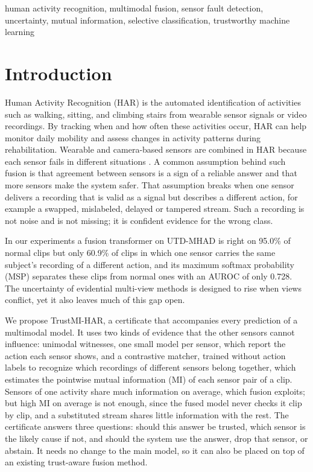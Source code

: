 \documentclass[conference]{IEEEtran}
\begin{document}
\begin{IEEEkeywords}
human activity recognition, multimodal fusion, sensor fault detection, uncertainty, mutual information, selective classification, trustworthy machine learning
\end{IEEEkeywords}

\section{Introduction}
Human Activity Recognition (HAR) is the automated identification of activities such as walking, sitting, and climbing stairs from wearable sensor signals or video recordings\cite{T1,T2}. By tracking when and how often these activities occur, HAR can help monitor daily mobility and assess changes in activity patterns during rehabilitation\cite{T3,T4,T5}.
Wearable and camera-based sensors are combined in HAR because each sensor fails in different situations \cite{Ref1,Ref2,Ref3}. A common assumption behind such fusion is that agreement between sensors is a sign of a reliable answer and that more sensors make the system safer. That assumption breaks when one sensor delivers a recording that is valid as a signal but describes a different action, for example a swapped, mislabeled, delayed or tampered stream. Such a recording is not noise and is not missing; it is confident evidence for the wrong class.

In our experiments a fusion transformer on UTD-MHAD is right on 95.0\% of normal clips but only 60.9\% of clips in which one sensor carries the same subject's recording of a different action, and its maximum softmax probability (MSP) \cite{Ref4} separates these clips from normal ones with an AUROC of only 0.728. The uncertainty of evidential multi-view methods \cite{Ref5,Ref6,Ref7} is designed to rise when views conflict, yet it also leaves much of this gap open.

We propose TrustMI-HAR, a certificate that accompanies every prediction of a multimodal model. It uses two kinds of evidence that the other sensors cannot influence: unimodal witnesses, one small model per sensor, which report the action each sensor shows, and a contrastive matcher, trained without action labels to recognize which recordings of different sensors belong together, which estimates the pointwise mutual information (MI) of each sensor pair of a clip. Sensors of one activity share much information on average, which fusion exploits; but high MI on average is not enough, since the fused model never checks it clip by clip, and a substituted stream shares little information with the rest. The certificate answers three questions: should this answer be trusted, which sensor is the likely cause if not, and should the system use the answer, drop that sensor, or abstain. It needs no change to the main model, so it can also be placed on top of an existing trust-aware fusion method.
\end{document}
